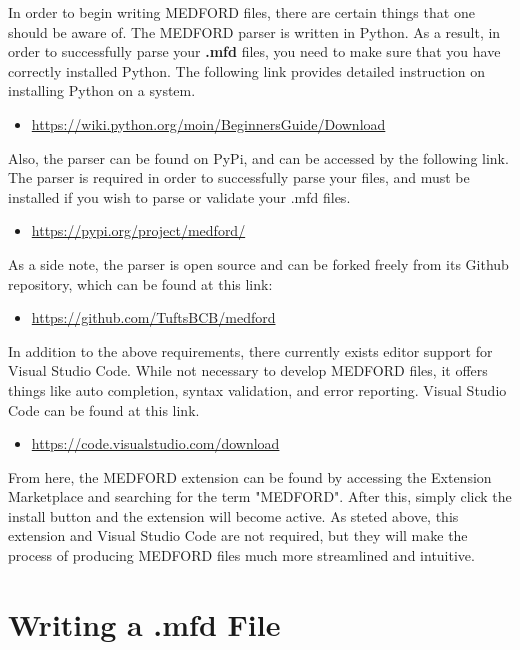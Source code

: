 \documentclass[]{article}%
\begin{document}
In order to begin writing MEDFORD files, there are certain things that one should be aware of. The MEDFORD parser is written in Python. As a result, in order to successfully parse your \textbf{.mfd} files, you need to make sure that you have correctly installed Python. The following link provides detailed instruction on installing Python on a system.
\begin{itemize}
    \item \href{https://wiki.python.org/moin/BeginnersGuide/Download}{https://wiki.python.org/moin/BeginnersGuide/Download}
\end{itemize}
Also, the parser can be found on PyPi, and can be accessed by the following link. The parser is required in order to successfully parse your files, and must be installed if you wish to parse or validate your .mfd files. 
\begin{itemize}
    \item \href{https://pypi.org/project/medford/}{https://pypi.org/project/medford/}
\end{itemize}
As a side note, the parser is open source and can be forked freely from its Github repository, which can be found at this link:
\begin{itemize}
    \item \href{https://github.com/TuftsBCB/medford}{https://github.com/TuftsBCB/medford}
\end{itemize}
In addition to the above requirements, there currently exists editor support for Visual Studio Code. While not necessary to develop MEDFORD files, it offers things like auto completion, syntax validation, and error reporting. Visual Studio Code can be found at this link.
\begin{itemize}
    \item \href{https://code.visualstudio.com/download}{https://code.visualstudio.com/download}
\end{itemize}

From here, the MEDFORD extension can be found by accessing the Extension Marketplace and searching for the term "MEDFORD". After this, simply click the install button and the extension will become active. As steted above, this extension and Visual Studio Code are not required, but they will make the process of producing MEDFORD files much more streamlined and intuitive.

\section{Writing a .mfd File}
\end{document}
